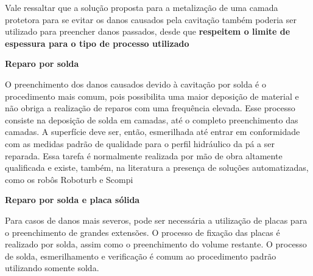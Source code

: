 Vale ressaltar que a solução proposta para a metalização de uma camada protetora
para se evitar os danos causados pela cavitação também poderia ser utilizado
para preencher danos passados, desde que \textbf{respeitem o limite de espessura
para o tipo de processo utilizado}


\textbf{Reparo por solda}

O preenchimento dos danos causados devido à cavitação por solda é o procedimento
mais comum, pois possibilita uma maior deposição de material e não obriga a
realização de reparos com uma frequência elevada. Esse processo consiste na
deposição de solda em camadas, até o completo preenchimento das camadas. A
superfície deve ser, então, esmerilhada até entrar em conformidade com as
medidas padrão de qualidade para o perfil hidráulico da pá a ser reparada. Essa tarefa
é normalmente realizada por mão de obra altamente qualificada e existe, também,
na literatura a presença de soluções automatizadas, como os robôs Roboturb e Scompi
\citep{roboturb,scompi}

\textbf{Reparo por solda e placa sólida}

Para casos de danos mais severos, pode ser necessária a utilização de placas
para o preenchimento de grandes extensões. O processo de fixação das placas é
realizado por solda, assim como o preenchimento do volume restante. O processo
de solda, esmerilhamento e verificação é comum ao procedimento padrão utilizando
somente solda.















